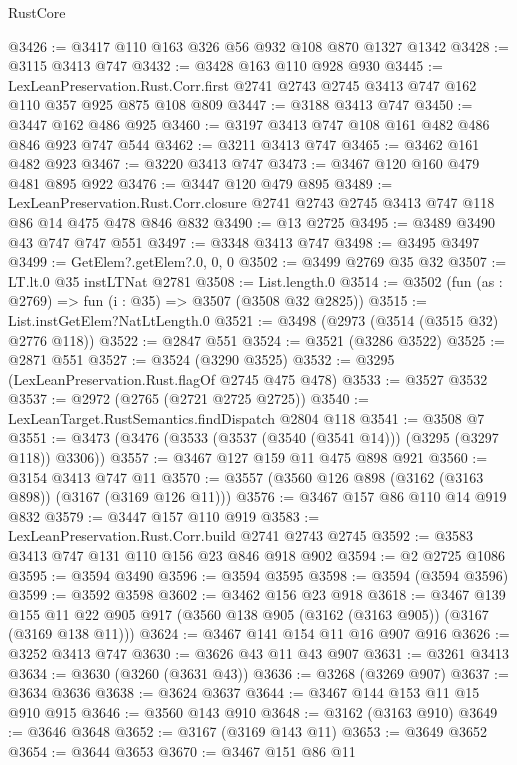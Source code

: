 \begin{lexlean}{RustCore}
\begin{coremodule}
@3426 := @3417 @110 @163 @326 @56 @932 @108 @870 @1327 @1342
@3428 := @3115 @3413 @747
@3432 := @3428 @163 @110 @928 @930
@3445 := LexLeanPreservation.Rust.Corr.first
    @2741
    @2743
    @2745
    @3413
    @747
    @162
    @110
    @357
    @925
    @875
    @108
    @809
@3447 := @3188 @3413 @747
@3450 := @3447 @162 @486 @925
@3460 := @3197 @3413 @747 @108 @161 @482 @486 @846 @923 @747 @544
@3462 := @3211 @3413 @747
@3465 := @3462 @161 @482 @923
@3467 := @3220 @3413 @747
@3473 := @3467 @120 @160 @479 @481 @895 @922
@3476 := @3447 @120 @479 @895
@3489 := LexLeanPreservation.Rust.Corr.closure
    @2741
    @2743
    @2745
    @3413
    @747
    @118
    @86
    @14
    @475
    @478
    @846
    @832
@3490 := @13 @2725
@3495 := @3489 @3490 @43 @747 @747 @551
@3497 := @3348 @3413 @747
@3498 := @3495 @3497
@3499 := GetElem?.getElem?.{0, 0, 0}
@3502 := @3499 @2769 @35 @32
@3507 := LT.lt.{0} @35 instLTNat @2781
@3508 := List.length.{0}
@3514 := @3502 (fun (as : @2769) => fun (i : @35) => @3507 (@3508 @32 @2825))
@3515 := List.instGetElem?NatLtLength.{0}
@3521 := @3498 (@2973 (@3514 (@3515 @32) @2776 @118))
@3522 := @2847 @551
@3524 := @3521 (@3286 @3522)
@3525 := @2871 @551
@3527 := @3524 (@3290 @3525)
@3532 := @3295 (LexLeanPreservation.Rust.flagOf @2745 @475 @478)
@3533 := @3527 @3532
@3537 := @2972 (@2765 (@2721 @2725 @2725))
@3540 := LexLeanTarget.RustSemantics.findDispatch @2804 @118
@3541 := @3508 @7
@3551 := @3473 (@3476 (@3533 (@3537 (@3540 (@3541 @14))) (@3295 (@3297 @118)) @3306))
@3557 := @3467 @127 @159 @11 @475 @898 @921
@3560 := @3154 @3413 @747 @11
@3570 := @3557 (@3560 @126 @898 (@3162 (@3163 @898)) (@3167 (@3169 @126 @11)))
@3576 := @3467 @157 @86 @110 @14 @919 @832
@3579 := @3447 @157 @110 @919
@3583 := LexLeanPreservation.Rust.Corr.build @2741 @2743 @2745
@3592 := @3583 @3413 @747 @131 @110 @156 @23 @846 @918 @902
@3594 := @2 @2725 @1086
@3595 := @3594 @3490
@3596 := @3594 @3595
@3598 := @3594 (@3594 @3596)
@3599 := @3592 @3598
@3602 := @3462 @156 @23 @918
@3618 := @3467
    @139
    @155
    @11
    @22
    @905
    @917
    (@3560 @138 @905 (@3162 (@3163 @905)) (@3167 (@3169 @138 @11)))
@3624 := @3467 @141 @154 @11 @16 @907 @916
@3626 := @3252 @3413 @747
@3630 := @3626 @43 @11 @43 @907
@3631 := @3261 @3413
@3634 := @3630 (@3260 (@3631 @43))
@3636 := @3268 (@3269 @907)
@3637 := @3634 @3636
@3638 := @3624 @3637
@3644 := @3467 @144 @153 @11 @15 @910 @915
@3646 := @3560 @143 @910
@3648 := @3162 (@3163 @910)
@3649 := @3646 @3648
@3652 := @3167 (@3169 @143 @11)
@3653 := @3649 @3652
@3654 := @3644 @3653
@3670 := @3467
    @151
    @86
    @11

\end{coremodule}
\end{lexlean}
